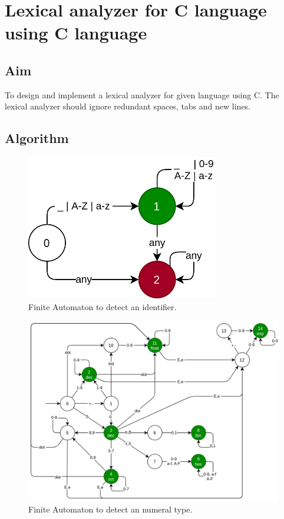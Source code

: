 \clearpage
\chapter{Lexical analyzer for C language using C language}

\section{Aim}
To design and implement a lexical analyzer for given language using C. The lexical analyzer should ignore redundant spaces, tabs and new lines.

\section{Algorithm}

\begin{figure}[H]
	\centering
	\includegraphics[height=2.5in]{../EXP1/identifier.png}
	\caption{Finite Automaton to detect an identifier.}
\end{figure}

\begin{figure}[H]
	\centering
	\includegraphics[width=\textwidth]{../EXP1/numerals.png}
	\caption{Finite Automaton to detect an numeral type.}
\end{figure}



